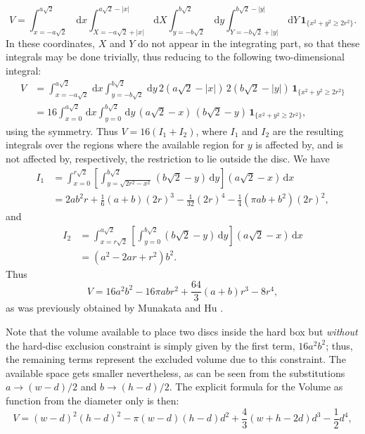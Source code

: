 \documentclass[a4paper,10pt, jcp, aps, preprint]{revtex4-1}
\newcommand{\rd}{\, \mathrm{d}}
\newcommand{\indicator}[1]{\mathbf{1}_{ \{   #1 \} } }
\begin{document}
\begin{equation}\label{integraltotal}
 V = \int_{x=-a \sqrt{2}}^{a \sqrt{2}} \rd x 
\int_{X=-a \sqrt{2} + |x| }^{a \sqrt{2} - |x|}  \rd X
 \int_{y=-b \sqrt{2}}^{b \sqrt{2}} \rd y
\int_{Y=-b \sqrt{2} + |y| }^{b \sqrt{2}-|y|}  \rd Y
\, \indicator{ x^2 + y^2 \ge 2r^2  }.
\end{equation}
In these coordinates, $X$ and $Y$ do not appear in the integrating part, 
so that these integrals may be done trivially, 
thus reducing to the following two-dimensional integral:
\begin{align}
 V &= \int_{x=-a \sqrt{2}}^{a \sqrt{2}} \rd x  \int_{y=-b \sqrt{2}}^{b \sqrt{2}} \rd y
\, 2 \left( a \sqrt{2} - |x| \right) \, 2 \left( b \sqrt{2} - |y| \right) \,  \indicator{ x^2 + y^2 \ge 2r^2 } \\
&= 16 \int_{x=0}^{a \sqrt{2}} \rd x  \int_{y=0}^{b \sqrt{2}} \rd y
\, \left( a \sqrt{2} - x \right) \, \left( b \sqrt{2} - y \right) \,  \indicator{ x^2 + y^2 \ge 2r^2 },
\end{align}
using the symmetry.
Thus $V = 16(I_1 + I_2)$, where $I_1$ and $I_2$ are the 
resulting integrals over the regions where the available region 
for $y$ is affected by, and is not affected by, respectively, 
the restriction to lie outside the disc.
We have
\begin{align}
 I_1 &= \int_{x=0}^{r\sqrt{2}} \left[ \int_{y = \sqrt{ 2r^2 - x^2}}^{b \sqrt{2}} \left( b \sqrt{2} - y \right) \rd y \right]  \left( a \sqrt{2} - x \right) \rd x \\
&= 	
2 a b^{2} r  + \textstyle \frac{1}{6} (a+b) (2r)^{3} - \frac{1}{32}  (2r)^{4} - \frac{1}{4} {\left(\pi a b + b^{2}\right)} (2r)^2,
\end{align}
and
\begin{align}
 I_2 &= \int_{x=r  \sqrt{2}}^{a \sqrt{2}} \left[ \int_{y = 0}^{b \sqrt{2}} \left( b \sqrt{2} - y \right) \rd y \right]  \left( a \sqrt{2} - x \right) \rd x \\
&=	
{\left( a^{2} - 2ar +   r^{2}\right)} b^{2}.
\end{align}
Thus 
\begin{equation}\label{volumeabd}
 V %
= 16 a^{2} b^{2}  - 16 \pi a b r^{2} + \textstyle \frac{64}{3} (a+b) r^{3}  - 8 r^{4},
\end{equation}
as was previously obtained by Munakata and Hu \cite{Munakata02}.

Note that the volume available to place two discs inside 
the hard box but \emph{without} the 
 hard-disc exclusion constraint is simply 
given by the first term, $16 a^2 b^2$; 
thus, the remaining terms represent the excluded volume due to this constraint.
The available space gets smaller nevertheless, as can be seen from
the substitutions $a\rightarrow (w-d)/2$ and $b\rightarrow (h-d)/2$.
The explicit formula for the Volume as function from the diameter only is then:
\begin{equation}\label{volumewhd}
 V 
= (w-d)^{2} (h-d)^{2}  - 
 \pi (w-d)(h-d) d^{2} + 
\textstyle \frac{4}{3} (w+h-2d) d^{3}  
- \frac{1}{2} d^{4},
\end{equation}
 
\end{document}
